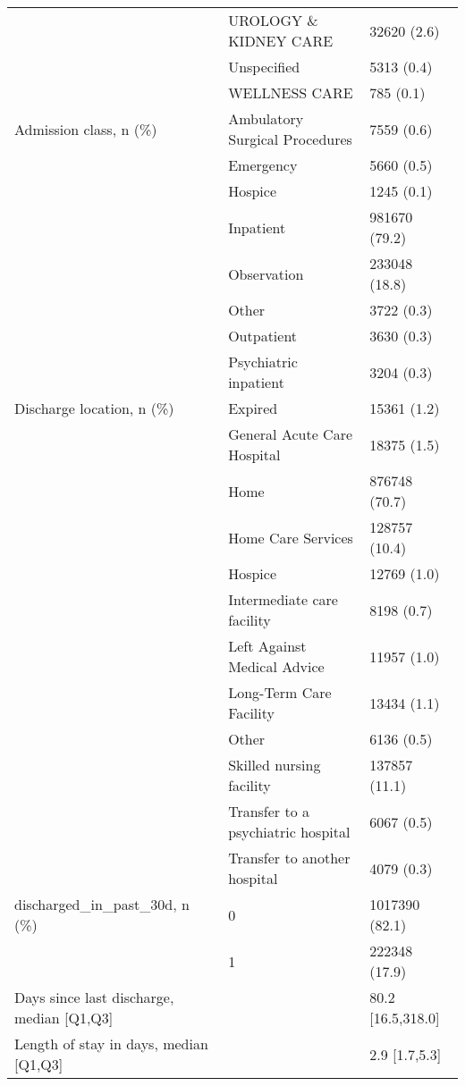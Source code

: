 \begin{tabular}{lll}
                                       & UROLOGY \& KIDNEY CARE &        32620 (2.6) \\
                                       & Unspecified &         5313 (0.4) \\
                                       & WELLNESS CARE &          785 (0.1) \\
Admission class, n (\%) & Ambulatory Surgical Procedures &         7559 (0.6) \\
                                       & Emergency &         5660 (0.5) \\
                                       & Hospice &         1245 (0.1) \\
                                       & Inpatient &      981670 (79.2) \\
                                       & Observation &      233048 (18.8) \\
                                       & Other &         3722 (0.3) \\
                                       & Outpatient &         3630 (0.3) \\
                                       & Psychiatric inpatient &         3204 (0.3) \\
Discharge location, n (\%) & Expired &        15361 (1.2) \\
                                       & General Acute Care Hospital &        18375 (1.5) \\
                                       & Home &      876748 (70.7) \\
                                       & Home Care Services &      128757 (10.4) \\
                                       & Hospice &        12769 (1.0) \\
                                       & Intermediate care facility &         8198 (0.7) \\
                                       & Left Against Medical Advice &        11957 (1.0) \\
                                       & Long-Term Care Facility &        13434 (1.1) \\
                                       & Other &         6136 (0.5) \\
                                       & Skilled nursing facility &      137857 (11.1) \\
                                       & Transfer to a psychiatric hospital &         6067 (0.5) \\
                                       & Transfer to another hospital &         4079 (0.3) \\
discharged\_in\_past\_30d, n (\%) & 0 &     1017390 (82.1) \\
                                       & 1 &      222348 (17.9) \\
Days since last discharge, median [Q1,Q3] &   &  80.2 [16.5,318.0] \\
Length of stay in days, median [Q1,Q3] &   &      2.9 [1.7,5.3] \\
\bottomrule
\end{tabular}
